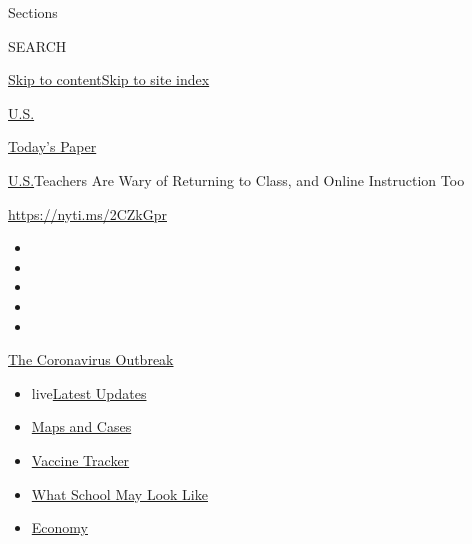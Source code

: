 Sections

SEARCH

\protect\hyperlink{site-content}{Skip to
content}\protect\hyperlink{site-index}{Skip to site index}

\href{https://www.nytimes.com/section/us}{U.S.}

\href{https://myaccount.nytimes.com/auth/login?response_type=cookie\&client_id=vi}{}

\href{https://www.nytimes.com/section/todayspaper}{Today's Paper}

\href{/section/us}{U.S.}\textbar{}Teachers Are Wary of Returning to
Class, and Online Instruction Too

\url{https://nyti.ms/2CZkGpr}

\begin{itemize}
\item
\item
\item
\item
\item
\end{itemize}

\href{https://www.nytimes.com/news-event/coronavirus?action=click\&pgtype=Article\&state=default\&region=TOP_BANNER\&context=storylines_menu}{The
Coronavirus Outbreak}

\begin{itemize}
\tightlist
\item
  live\href{https://www.nytimes.com/2020/08/01/world/coronavirus-covid-19.html?action=click\&pgtype=Article\&state=default\&region=TOP_BANNER\&context=storylines_menu}{Latest
  Updates}
\item
  \href{https://www.nytimes.com/interactive/2020/us/coronavirus-us-cases.html?action=click\&pgtype=Article\&state=default\&region=TOP_BANNER\&context=storylines_menu}{Maps
  and Cases}
\item
  \href{https://www.nytimes.com/interactive/2020/science/coronavirus-vaccine-tracker.html?action=click\&pgtype=Article\&state=default\&region=TOP_BANNER\&context=storylines_menu}{Vaccine
  Tracker}
\item
  \href{https://www.nytimes.com/interactive/2020/07/29/us/schools-reopening-coronavirus.html?action=click\&pgtype=Article\&state=default\&region=TOP_BANNER\&context=storylines_menu}{What
  School May Look Like}
\item
  \href{https://www.nytimes.com/live/2020/07/31/business/stock-market-today-coronavirus?action=click\&pgtype=Article\&state=default\&region=TOP_BANNER\&context=storylines_menu}{Economy}
\end{itemize}

